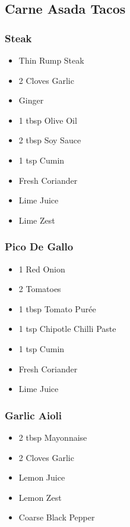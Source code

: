 \documentclass[11pt, english]{article}
\begin{document}
\newpage

	\subsection{Carne Asada Tacos}

		\subsubsection*{Steak}

	\begin{itemize}
        \setlength\itemsep{0cm}
		\item Thin Rump Steak
		\item 2 Cloves Garlic
		\item Ginger
		\item 1 tbsp Olive Oil
		\item 2 tbsp Soy Sauce
		\item 1 tsp Cumin
		\item Fresh Coriander
		\item Lime Juice
		\item Lime Zest
	\end{itemize}

		\subsubsection*{Pico De Gallo}
	
	\begin{itemize}
        \setlength\itemsep{0cm}
                \item 1 Red Onion
		\item 2 Tomatoes
		\item 1 tbsp Tomato Pur\'{e}e
		\item 1 tsp Chipotle Chilli Paste
		\item 1 tsp Cumin
		\item Fresh Coriander
		\item Lime Juice
        \end{itemize}

		\subsubsection*{Garlic Aioli}

	\begin{itemize}
        \setlength\itemsep{0cm}
                \item 2 tbsp Mayonnaise
		\item 2 Cloves Garlic
		\item Lemon Juice
		\item Lemon Zest
		\item Coarse Black Pepper
        \end{itemize}
\end{document}
